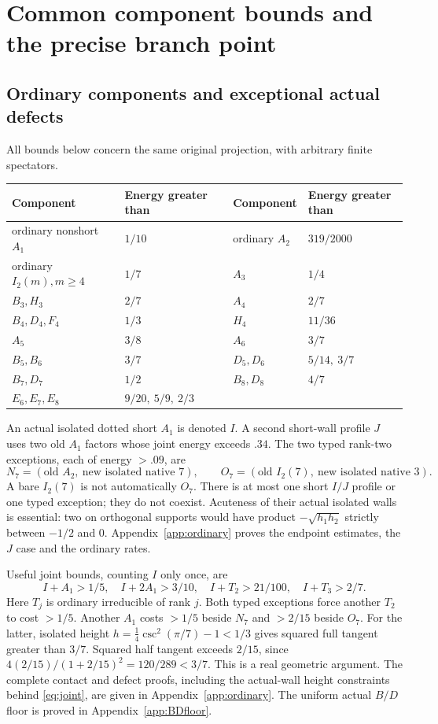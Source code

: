 \documentclass[11pt]{article}
\theoremstyle{definition}
\theoremstyle{remark}
\begin{document}
\section{Common component bounds and the precise branch point}
\label{sec:components}
\subsection{Ordinary components and exceptional actual defects}
All bounds below concern the same original projection, with
arbitrary finite spectators.
\begin{center}\small
\begin{tabular}{ll@{\qquad}ll}
\toprule
Component&Energy greater than&Component&Energy greater than\\ \midrule
ordinary nonshort \(A_1\)&\(1/10\)&ordinary \(A_2\)&\(319/2000\)\\
ordinary \(I_2(m),m\geq4\)&\(1/7\)&\(A_3\)&\(1/4\)\\
\(B_3,H_3\)&\(2/7\)&\(A_4\)&\(2/7\)\\
\(B_4,D_4,F_4\)&\(1/3\)&\(H_4\)&\(11/36\)\\
\(A_5\)&\(3/8\)&\(A_6\)&\(3/7\)\\
\(B_5,B_6\)&\(3/7\)&\(D_5,D_6\)&\(5/14,\ 3/7\)\\
\(B_7,D_7\)&\(1/2\)&\(B_8,D_8\)&\(4/7\)\\
\(E_6,E_7,E_8\)&\(9/20,\ 5/9,\ 2/3\)&&\\ \bottomrule
\end{tabular}
\end{center}
An actual isolated dotted short \(A_1\) is denoted \(I\).
A second short-wall profile \(J\) uses two old \(A_1\) factors
whose joint energy exceeds \(.34\).
The two typed rank-two exceptions, each of energy \(>.09\), are
\[
 N_7=(\text{old }A_2,\ \text{new isolated native }7),\qquad
 O_7=(\text{old }I_2(7),\ \text{new isolated native }3).
\]
A bare \(I_2(7)\) is not automatically \(O_7\).
There is at most one short \(I/J\) profile or one typed exception;
they do not coexist. Acuteness of their actual isolated walls
is essential: two on orthogonal supports would have product
\(-\sqrt{h_1h_2}\) strictly between \(-1/2\) and \(0\).
Appendix~\ref{app:ordinary} proves the endpoint estimates,
the \(J\) case and the ordinary rates.

Useful joint bounds, counting \(I\) only once, are
\begin{equation}
\label{eq:joint}
 I+A_1>1/5,\quad I+2A_1>3/10,\quad
 I+T_2>21/100,\quad I+T_3>2/7.
\end{equation}
Here \(T_j\) is ordinary irreducible of rank \(j\).
Both typed exceptions force another \(T_2\) to cost \(>1/5\).
Another \(A_1\) costs \(>1/5\) beside \(N_7\) and \(>2/15\)
beside \(O_7\). For the latter, isolated height
\(h=\tfrac14\csc^2(\pi/7)-1<1/3\) gives squared full tangent
greater than \(3/7\). Squared half tangent exceeds \(2/15\),
since \(4(2/15)/(1+2/15)^2=120/289<3/7\).
This is a real geometric argument.
The complete contact and defect proofs, including the actual-wall
height constraints behind \eqref{eq:joint}, are given in
Appendix~\ref{app:ordinary}. The uniform actual \(B/D\) floor
is proved in Appendix~\ref{app:BDfloor}.
\end{document}
